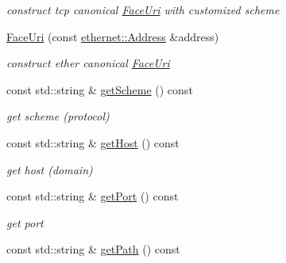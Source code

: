 \begin{DoxyCompactItemize}
\begin{DoxyCompactList}\small\item\em construct tcp canonical \hyperlink{classndn_1_1util_1_1FaceUri}{Face\+Uri} with customized scheme \end{DoxyCompactList}\item 
\hyperlink{classndn_1_1util_1_1FaceUri_aebb05d1a40f8e39168ee0642491c70a7}{Face\+Uri} (const \hyperlink{classndn_1_1util_1_1ethernet_1_1Address}{ethernet\+::\+Address} \&address)\hypertarget{classndn_1_1util_1_1FaceUri_aebb05d1a40f8e39168ee0642491c70a7}{}\label{classndn_1_1util_1_1FaceUri_aebb05d1a40f8e39168ee0642491c70a7}

\begin{DoxyCompactList}\small\item\em construct ether canonical \hyperlink{classndn_1_1util_1_1FaceUri}{Face\+Uri} \end{DoxyCompactList}\item 
const std\+::string \& \hyperlink{classndn_1_1util_1_1FaceUri_ace297dc14f8e8ecc00e4296190faecba}{get\+Scheme} () const\hypertarget{classndn_1_1util_1_1FaceUri_ace297dc14f8e8ecc00e4296190faecba}{}\label{classndn_1_1util_1_1FaceUri_ace297dc14f8e8ecc00e4296190faecba}

\begin{DoxyCompactList}\small\item\em get scheme (protocol) \end{DoxyCompactList}\item 
const std\+::string \& \hyperlink{classndn_1_1util_1_1FaceUri_adc48368e37c64a9495a901fb901ccf8d}{get\+Host} () const\hypertarget{classndn_1_1util_1_1FaceUri_adc48368e37c64a9495a901fb901ccf8d}{}\label{classndn_1_1util_1_1FaceUri_adc48368e37c64a9495a901fb901ccf8d}

\begin{DoxyCompactList}\small\item\em get host (domain) \end{DoxyCompactList}\item 
const std\+::string \& \hyperlink{classndn_1_1util_1_1FaceUri_a16a45cece735bdbdb29e7b8e4c4c6d74}{get\+Port} () const\hypertarget{classndn_1_1util_1_1FaceUri_a16a45cece735bdbdb29e7b8e4c4c6d74}{}\label{classndn_1_1util_1_1FaceUri_a16a45cece735bdbdb29e7b8e4c4c6d74}

\begin{DoxyCompactList}\small\item\em get port \end{DoxyCompactList}\item 
const std\+::string \& \hyperlink{classndn_1_1util_1_1FaceUri_a6a0448961f81cd8da8fe45aff6f6f6f7}{get\+Path} () const\hypertarget{classndn_1_1util_1_1FaceUri_a6a0448961f81cd8da8fe45aff6f6f6f7}{}\label{classndn_1_1util_1_1FaceUri_a6a0448961f81cd8da8fe45aff6f6f6f7}


\end{DoxyCompactItemize}
